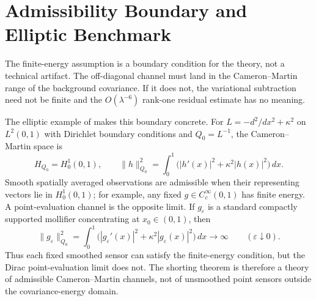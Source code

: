\section{Admissibility Boundary and Elliptic Benchmark}
\label{app:admissibility_boundary}

The finite-energy assumption is a boundary condition for the theory, not a
technical artifact.  The off-diagonal channel must land in the Cameron--Martin
range of the background covariance.  If it does not, the variational subtraction
need not be finite and the $O(\lambda^{-6})$ rank-one residual estimate has no
meaning.

The elliptic example of  makes this boundary concrete.  For
$L=-d^2/dx^2+\kappa^2$ on $L^2(0,1)$ with Dirichlet boundary conditions and
$Q_0=L^{-1}$, the Cameron--Martin space is
\[
  H_{Q_0}=H_0^1(0,1),
  \qquad
  \|h\|_{Q_0}^2
  =
  \int_0^1\bigl(|h'(x)|^2+\kappa^2|h(x)|^2\bigr)\,dx .
\]
Smooth spatially averaged observations are admissible when their representing
vectors lie in $H_0^1(0,1)$; for example, any fixed
$g\in C_c^\infty(0,1)$ has finite energy.  A point-evaluation channel is the
opposite limit.  If $g_\varepsilon$ is a standard compactly supported mollifier
concentrating at $x_0\in(0,1)$, then
\[
  \|g_\varepsilon\|_{Q_0}^2
  =
  \int_0^1\bigl(|g_\varepsilon'(x)|^2+\kappa^2|g_\varepsilon(x)|^2\bigr)\,dx
  \longrightarrow \infty
  \qquad(\varepsilon\downarrow0).
\]
Thus each fixed smoothed sensor can satisfy the finite-energy condition, but
the Dirac point-evaluation limit does not.  The shorting theorem is therefore a
theory of admissible Cameron--Martin channels, not of unsmoothed point sensors
outside the covariance-energy domain.
